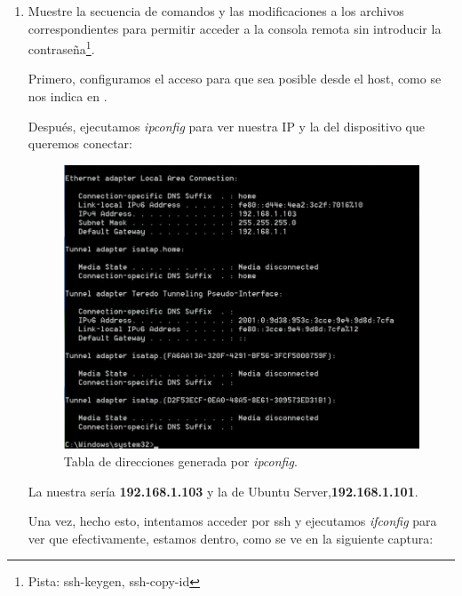 \documentclass[paper=a4, fontsize=11pt]{scrartcl} %
\numberwithin{equation}{section} %
\numberwithin{figure}{section} %
\numberwithin{table}{section} %
\begin{document}
\begin{enumerate}
		\item Muestre la secuencia de comandos y las modificaciones a los archivos correspondientes
		para permitir acceder a la consola remota sin introducir la contraseña\footnote{Pista: ssh-keygen,
		ssh-copy-id}.
		
		Primero, configuramos el acceso para que sea posible desde el host, como se nos indica en
		\cite{SSH_StackOverFlow}.
		
		Después, ejecutamos \textit{ipconfig} para ver nuestra IP y la del dispositivo que queremos
		conectar:
		
		\begin{figure}[H]
			\centering
			\includegraphics[width=15cm]{Ejercicio_8a.jpg}
			\caption{Tabla de direcciones generada por \textit{ipconfig}.}
			\label{fig:ipconfig}	
		\end{figure}
		
		La nuestra sería \textbf{192.168.1.103} y la de Ubuntu Server,\textbf{192.168.1.101}.
		
		Una vez, hecho esto, intentamos acceder por ssh y ejecutamos \textit{ifconfig} para ver que
		efectivamente, estamos dentro, como se ve en la siguiente captura:
		

\end{enumerate}
\end{document}
